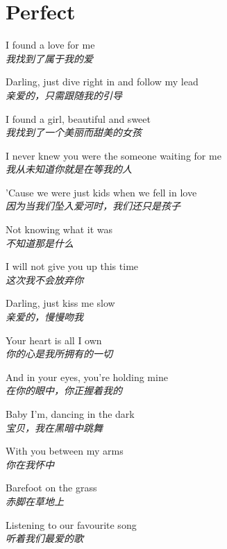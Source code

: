 \section{Perfect}

\thispagestyle{empty}


\begin{spacing}{1.5}
\begin{flushleft}
I found a love for me\\
\textit{我找到了属于我的爱}\lyricspace

Darling, just dive right in and follow my lead\\
\textit{亲爱的，只需跟随我的引导}\lyricspace

I found a girl, beautiful and sweet\\
\textit{我找到了一个美丽而甜美的女孩}\lyricspace

I never knew you were the someone waiting for me\\
\textit{我从未知道你就是在等我的人}\lyricspace

'Cause we were just kids when we fell in love\\
\textit{因为当我们坠入爱河时，我们还只是孩子}\lyricspace

Not knowing what it was\\
\textit{不知道那是什么}\lyricspace

I will not give you up this time\\
\textit{这次我不会放弃你}\lyricspace

Darling, just kiss me slow\\
\textit{亲爱的，慢慢吻我}\lyricspace

Your heart is all I own\\
\textit{你的心是我所拥有的一切}\lyricspace

And in your eyes, you're holding mine\\
\textit{在你的眼中，你正握着我的}\lyricspace

Baby I'm, dancing in the dark\\
\textit{宝贝，我在黑暗中跳舞}\lyricspace

With you between my arms\\
\textit{你在我怀中}\lyricspace

Barefoot on the grass\\
\textit{赤脚在草地上}\lyricspace

Listening to our favourite song\\
\textit{听着我们最爱的歌}\lyricspace


\end{flushleft}
\end{spacing}
